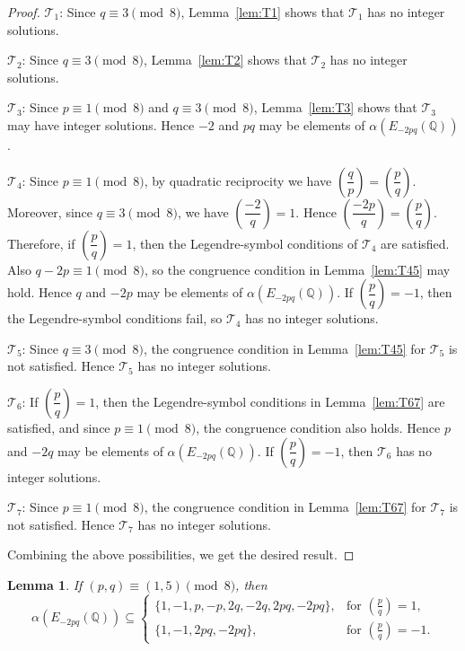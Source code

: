 \documentclass[12pt]{amsart}
\newcommand{\bbQ}{\mathbb{Q}}
\newcommand{\cT}{\mathcal{T}}
\newcommand{\legendre}[2]{\genfrac{(}{)}{}{}{#1}{#2}}
\numberwithin{equation}{section}
\newtheorem{lem}{Lemma}[section]
\theoremstyle{definition}
\begin{document}
\begin{proof}
$\cT_{1}$: Since $q\equiv 3\pmod 8$, Lemma~\ref{lem:T1} shows that $\cT_{1}$ has no integer solutions.

$\cT_{2}$: Since $q\equiv 3\pmod 8$, Lemma~\ref{lem:T2} shows that $\cT_{2}$ has no integer solutions.

$\cT_{3}$: Since $p\equiv 1\pmod 8$ and $q\equiv 3\pmod 8$, Lemma~\ref{lem:T3} shows that $\cT_{3}$ may have integer solutions. Hence $-2$ and $pq$ may be elements of $\alpha\left(E_{-2pq}(\bbQ)\right)$.

$\cT_{4}$: Since $p\equiv 1\pmod 8$, by quadratic reciprocity we have
$
\left(\dfrac{q}{p}\right)=\left(\dfrac{p}{q}\right).
$
Moreover, since $q\equiv 3\pmod 8$, we have $\left(\dfrac{-2}{q}\right)=1$. Hence
$
\left(\dfrac{-2p}{q}\right)=\left(\dfrac{p}{q}\right).
$
Therefore, if $\left(\dfrac{p}{q}\right)=1$, then the Legendre-symbol conditions of $\cT_{4}$ are satisfied. Also $q-2p\equiv 1\pmod 8$, so the congruence condition in Lemma~\ref{lem:T45} may hold. Hence $q$ and $-2p$ may be elements of $\alpha\left(E_{-2pq}(\bbQ)\right)$. If $\left(\dfrac{p}{q}\right)=-1$, then the Legendre-symbol conditions fail, so $\cT_{4}$ has no integer solutions.

$\cT_{5}$: Since $q\equiv 3\pmod 8$, the congruence condition in Lemma~\ref{lem:T45} for $\cT_{5}$ is not satisfied. Hence $\cT_{5}$ has no integer solutions.

$\cT_{6}$: If $\left(\dfrac{p}{q}\right)=1$, then the Legendre-symbol conditions in Lemma~\ref{lem:T67} are satisfied, and since $p\equiv 1\pmod 8$, the congruence condition also holds. Hence $p$ and $-2q$ may be elements of $\alpha\left(E_{-2pq}(\bbQ)\right)$. If $\left(\dfrac{p}{q}\right)=-1$, then $\cT_{6}$ has no integer solutions.

$\cT_{7}$: Since $p\equiv 1\pmod 8$, the congruence condition in Lemma~\ref{lem:T67} for $\cT_{7}$ is not satisfied. Hence $\cT_{7}$ has no integer solutions.

Combining the above possibilities, we get the desired result.
\end{proof}

\begin{lem}
\label{lem:alpha_case_2.2}
If $(p,q)\equiv (1,5)\pmod 8$, then
\[
\alpha\left(E_{-2pq}(\bbQ)\right)\subseteq
\begin{cases}
\{1,-1,p,-p,2q,-2q,2pq,-2pq\},
& \text{for } \legendre{p}{q}=1,\\
\{1,-1,2pq,-2pq\},
& \text{for } \legendre{p}{q}=-1.
\end{cases}
\]
\end{lem}
\end{document}
